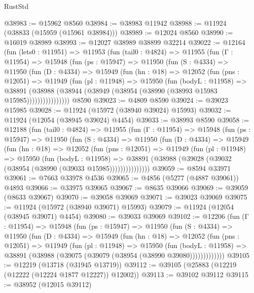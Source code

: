 \begin{lexlean}{RustStd}
\begin{coremodule}
@38983 := @15962 @8560
@38984 := @38983 @11942
@38988 := @11924 (@38833 (@15959 (@15961 @38984)))
@38989 := @12024 @8560
@38990 := @16019 @38989
@38993 := @12027 @38989 @38899 @32214
@39022 := @12164
    (fun (lets0 : @11951) =>
    @11953
      (fun (tail0 : @4824) =>
      @11955
        (fun (Γ : @11954) =>
        @15948
          (fun (ps : @15947) =>
          @11950
            (fun (S : @4334) =>
            @11950
              (fun (D : @4334) =>
              @15949
                (fun (hn : @18) =>
                @12052
                  (fun (pns : @12051) =>
                  @11949
                    (fun (pl : @11948) =>
                    @15950
                      (fun (bodyL : @11958) =>
                      @38891
                        (@38988
                          (@38944 (@38949 (@38954 (@38990 (@38993 @15983 @15985))))))))))))))))
    @8590
@39023 := @4809 @8590
@39024 := @39023 @15985
@39028 := @11924 (@15972 (@38940 @39024) @15993)
@39032 := @11924 (@12054 (@38945 @39024) @4454)
@39033 := @38993 @8590
@39058 := @12188
    (fun (tail0 : @4824) =>
    @11955
      (fun (Γ : @11954) =>
      @15948
        (fun (ps : @15947) =>
        @11950
          (fun (S : @4334) =>
          @11950
            (fun (D : @4334) =>
            @15949
              (fun (hn : @18) =>
              @12052
                (fun (pns : @12051) =>
                @11949
                  (fun (pl : @11948) =>
                  @15950
                    (fun (bodyL : @11958) =>
                    @38891 (@38988 (@39028 (@39032 (@38954 (@38990 (@39033 @15985)))))))))))))))
@39059 := @8594 @33971
@39061 := @7663 @33978 @4536
@39065 := @4856 (@5277 (@4887 @39061)) @4893
@39066 := @33975 @39065
@39067 := @8635 @39066
@39069 := @39059 (@8633 @39067)
@39070 := @39058 @39069
@39071 := @39023 @39069
@39075 := @11924 (@15972 (@38940 @39071) @15993)
@39079 := @11924 (@12054 (@38945 @39071) @4454)
@39080 := @39033 @39069
@39102 := @12206
    (fun (Γ : @11954) =>
    @15948
      (fun (ps : @15947) =>
      @11950
        (fun (S : @4334) =>
        @11950
          (fun (D : @4334) =>
          @15949
            (fun (hn : @18) =>
            @12052
              (fun (pns : @12051) =>
              @11949
                (fun (pl : @11948) =>
                @15950
                  (fun (bodyL : @11958) =>
                  @38891 (@38988 (@39075 (@39079 (@38954 (@38990 @39080)))))))))))))
@39105 := @12219 (@13718 (@31945 @13719))
@39112 := @39105 (@25883 (@12219 (@12222 (@12224 @1877 @12227)) @12002))
@39113 := @39102 @39112
@39115 := @38952 (@12015 @39112)

\end{coremodule}
\end{lexlean}
